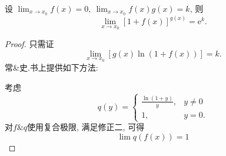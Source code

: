 \begin{proposition}
    设 $\displaystyle \lim_{x \to x_0} f \left( x \right) = 0,\ \lim_{x \to x_0} f \left( x \right) g \left( x \right) = k $, 则
    \begin{equation}
      \lim_{x \to x_0} \left[ 1 + f \left( x \right)  \right] ^{g \left( x \right) } = \mathrm{e}^{k}.
    \end{equation}
\end{proposition}
\begin{proof}
    只需证
    \begin{equation}
      \lim_{x \to x_0} \left[ g \left( x \right)  \ln \left( 1 + f \left( x \right)  \right)  \right] = k.
    \end{equation}
    常\&史.书上提供如下方法:

    考虑
    \begin{equation}
      q \left( y \right) = \begin{cases} 
        \frac{\ln \left( 1 + y \right) }{y}, & y \neq 0 
        \\ 
        1, & y = 0. 
      \end{cases}
    \end{equation}
    对$f \& q$使用复合极限, 满足修正二, 可得
    \begin{equation}
      \lim q \left( f \left( x \right)  \right) = 1
    \end{equation}
\end{proof}